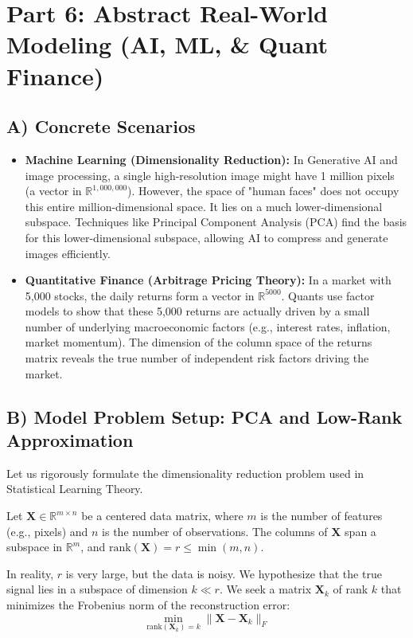 \documentclass[12pt]{article}
\begin{document}
\newpage
\section{Part 6: Abstract Real-World Modeling (AI, ML, \& Quant Finance)}

\subsection{A) Concrete Scenarios}
\begin{itemize}
    \item \textbf{Machine Learning (Dimensionality Reduction):} In Generative AI and image processing, a single high-resolution image might have 1 million pixels (a vector in $\mathbb{R}^{1,000,000}$). However, the space of "human faces" does not occupy this entire million-dimensional space. It lies on a much lower-dimensional subspace. Techniques like Principal Component Analysis (PCA) find the basis for this lower-dimensional subspace, allowing AI to compress and generate images efficiently.
    \item \textbf{Quantitative Finance (Arbitrage Pricing Theory):} In a market with 5,000 stocks, the daily returns form a vector in $\mathbb{R}^{5000}$. Quants use factor models to show that these 5,000 returns are actually driven by a small number of underlying macroeconomic factors (e.g., interest rates, inflation, market momentum). The dimension of the column space of the returns matrix reveals the true number of independent risk factors driving the market.
\end{itemize}

\subsection{B) Model Problem Setup: PCA and Low-Rank Approximation}
Let us rigorously formulate the dimensionality reduction problem used in Statistical Learning Theory.

Let $\mathbf{X} \in \mathbb{R}^{m \times n}$ be a centered data matrix, where $m$ is the number of features (e.g., pixels) and $n$ is the number of observations. The columns of $\mathbf{X}$ span a subspace in $\mathbb{R}^m$, and $\text{rank}(\mathbf{X}) = r \le \min(m, n)$.

In reality, $r$ is very large, but the data is noisy. We hypothesize that the true signal lies in a subspace of dimension $k \ll r$. We seek a matrix $\mathbf{X}_k$ of rank $k$ that minimizes the Frobenius norm of the reconstruction error:
\[ \min_{\text{rank}(\mathbf{X}_k) = k} \|\mathbf{X} - \mathbf{X}_k\|_F \]
\end{document}
